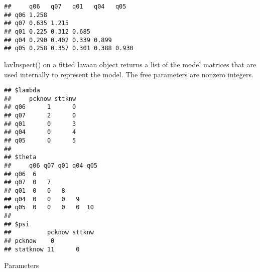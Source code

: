 \documentclass[
]{article}
\newenvironment{Shaded}{\begin{snugshade}}{\end{snugshade}}
\newcommand{\FunctionTok}[1]{\textcolor[rgb]{0.00,0.00,0.00}{#1}}
\newcommand{\NormalTok}[1]{#1}
\newcommand{\OtherTok}[1]{\textcolor[rgb]{0.56,0.35,0.01}{#1}}
\newcommand{\SpecialCharTok}[1]{\textcolor[rgb]{0.00,0.00,0.00}{#1}}
\newcommand{\StringTok}[1]{\textcolor[rgb]{0.31,0.60,0.02}{#1}}
\begin{document}
\begin{Shaded}
\end{Shaded}

\begin{verbatim}
##     q06   q07   q01   q04   q05  
## q06 1.258                        
## q07 0.635 1.215                  
## q01 0.225 0.312 0.685            
## q04 0.290 0.402 0.339 0.899      
## q05 0.258 0.357 0.301 0.388 0.930
\end{verbatim}

lavInspect() on a fitted lavaan object returns a list of the model
matrices that are used internally to represent the model. The free
parameters are nonzero integers.

\begin{Shaded}
\end{Shaded}

\begin{verbatim}
## $lambda
##     pcknow sttknw
## q06      1      0
## q07      2      0
## q01      0      3
## q04      0      4
## q05      0      5
## 
## $theta
##     q06 q07 q01 q04 q05
## q06  6                 
## q07  0   7             
## q01  0   0   8         
## q04  0   0   0   9     
## q05  0   0   0   0  10 
## 
## $psi
##          pcknow sttknw
## pcknow    0           
## statknow 11      0
\end{verbatim}

Parameters

\begin{Shaded}
\end{Shaded}
\end{document}

